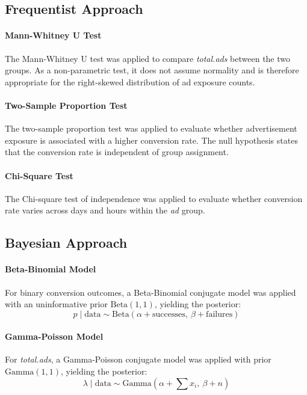 \documentclass[12pt]{article}
\begin{document}
\subsection{Frequentist Approach}

\paragraph{Mann-Whitney U Test}
The Mann-Whitney U test was applied to compare \textit{total.ads} between the two 
groups. As a non-parametric test, it does not assume normality and is therefore 
appropriate for the right-skewed distribution of ad exposure counts.

\paragraph{Two-Sample Proportion Test}
The two-sample proportion test was applied to evaluate whether advertisement exposure 
is associated with a higher conversion rate. The null hypothesis states that the 
conversion rate is independent of group assignment.

\paragraph{Chi-Square Test}
The Chi-square test of independence was applied to evaluate whether conversion rate 
varies across days and hours within the \textit{ad} group.


\subsection{Bayesian Approach}

\paragraph{Beta-Binomial Model}
For binary conversion outcomes, a Beta-Binomial conjugate model was applied with 
an uninformative prior $\text{Beta}(1, 1)$, yielding the posterior:
\[
p \mid \text{data} \sim \text{Beta}(\alpha + \text{successes},\ \beta + \text{failures})
\]

\paragraph{Gamma-Poisson Model}
For \textit{total.ads}, a Gamma-Poisson conjugate model was applied with 
prior $\text{Gamma}(1, 1)$, yielding the posterior:
\[
\lambda \mid \text{data} \sim \text{Gamma}\!\left(\alpha + \sum x_i,\ \beta + n\right)
\]
\end{document}
